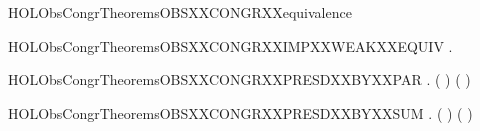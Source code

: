 \newcommand{\HOLObsCongrTheoremsOBSXXCONGRXXEPSYY}{\UseVerbatim{HOLObsCongrTheoremsOBSXXCONGRXXEPSYY}}
\begin{SaveVerbatim}{HOLObsCongrTheoremsOBSXXCONGRXXequivalence}
\HOLTokenTurnstile{}  
\end{SaveVerbatim}
\newcommand{\HOLObsCongrTheoremsOBSXXCONGRXXequivalence}{\UseVerbatim{HOLObsCongrTheoremsOBSXXCONGRXXequivalence}}
\begin{SaveVerbatim}{HOLObsCongrTheoremsOBSXXCONGRXXIMPXXWEAKXXEQUIV}
\HOLTokenTurnstile{} \HOLSymConst{\HOLTokenForall{}} .    \HOLSymConst{\HOLTokenImp{}}   
\end{SaveVerbatim}
\newcommand{\HOLObsCongrTheoremsOBSXXCONGRXXIMPXXWEAKXXEQUIV}{\UseVerbatim{HOLObsCongrTheoremsOBSXXCONGRXXIMPXXWEAKXXEQUIV}}
\begin{SaveVerbatim}{HOLObsCongrTheoremsOBSXXCONGRXXPRESDXXBYXXPAR}
\HOLTokenTurnstile{} \HOLSymConst{\HOLTokenForall{}}   .
          \HOLSymConst{\HOLTokenConj{}}    \HOLSymConst{\HOLTokenImp{}}
        ( \HOLSymConst{\ensuremath{\parallel}} ) ( \HOLSymConst{\ensuremath{\parallel}} )
\end{SaveVerbatim}
\newcommand{\HOLObsCongrTheoremsOBSXXCONGRXXPRESDXXBYXXPAR}{\UseVerbatim{HOLObsCongrTheoremsOBSXXCONGRXXPRESDXXBYXXPAR}}
\begin{SaveVerbatim}{HOLObsCongrTheoremsOBSXXCONGRXXPRESDXXBYXXSUM}
\HOLTokenTurnstile{} \HOLSymConst{\HOLTokenForall{}}   .
          \HOLSymConst{\HOLTokenConj{}}    \HOLSymConst{\HOLTokenImp{}}
        ( \HOLSymConst{+} ) ( \HOLSymConst{+} )
\end{SaveVerbatim}
